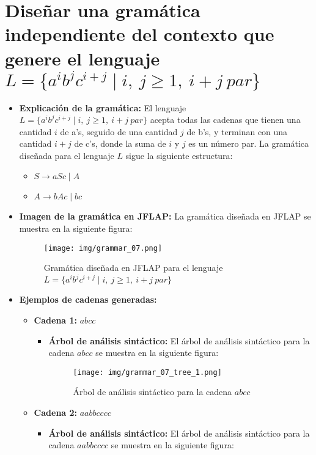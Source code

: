 \documentclass[11pt]{report}
\begin{document}
\section{Diseñar una gramática independiente del contexto que genere el lenguaje $L = \{a^i b^j c^{i+j} \mid i, \ j \geq 1, \ i + j \ par\}$}
\begin{itemize}
  \item \textbf{Explicación de la gramática:} El lenguaje $L = \{a^i b^j c^{i+j} \mid i, \ j \geq 1, \ i + j \ par\}$ acepta todas las cadenas que tienen una cantidad $i$ de a's, seguido de una cantidad $j$ de b's, y terminan con una cantidad $i + j$ de c's, donde la suma de $i$ y $j$ es un número par. La gramática diseñada para el lenguaje $L$ sigue la siguiente estructura:
  \begin{itemize}
    \item $S \rightarrow aSc \mid A$
    \item $A \rightarrow bAc \mid bc$
  \end{itemize}
  \item \textbf{Imagen de la gramática en JFLAP:} La gramática diseñada en JFLAP se muestra en la siguiente figura:
  \begin{figure}[H]
    \centering
    \texttt{[image: img/grammar\_07.png]}
    \caption{Gramática diseñada en JFLAP para el lenguaje $L = \{a^i b^j c^{i+j} \mid i, \ j \geq 1, \ i + j \ par\}$}
  \end{figure}
  \item \textbf{Ejemplos de cadenas generadas:}
  \begin{itemize}
    \item \textbf{Cadena 1:} $abcc$
    \begin{itemize}
      \item \textbf{Árbol de análisis sintáctico:} El árbol de análisis sintáctico para la cadena $abcc$ se muestra en la siguiente figura:
      \begin{figure}[H]
        \centering
        \texttt{[image: img/grammar\_07\_tree\_1.png]}
        \caption{Árbol de análisis sintáctico para la cadena $abcc$}
        \label{fig:arbol19}
      \end{figure}
    \end{itemize}
    \item \textbf{Cadena 2:} $aabbcccc$
    \begin{itemize}
      \item \textbf{Árbol de análisis sintáctico:} El árbol de análisis sintáctico para la cadena $aabbcccc$ se muestra en la siguiente figura:

\end{itemize}
\end{itemize}
\end{itemize}
\end{document}

